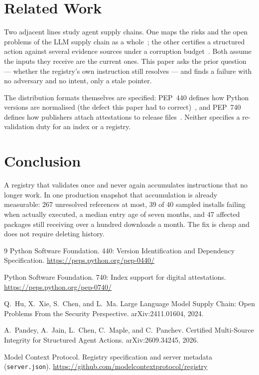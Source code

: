 \documentclass[acmsmall,screen,review,anonymous]{acmart}
\begin{document}
\section{Related Work}
Two adjacent lines study agent supply chains. One maps the risks and the open problems of the
LLM supply chain as a whole~\cite{llmsupplychain}; the other certifies a structured action
against several evidence sources under a corruption budget~\cite{multisource}. Both assume
the inputs they receive are the current ones. This paper asks the prior question --- whether
the registry's own instruction still resolves --- and finds a failure with no adversary and
no intent, only a stale pointer.

The distribution formats themselves are specified: PEP~440 defines how Python versions are
normalised (the defect this paper had to correct)~\cite{pep440}, and PEP~740 defines how
publishers attach attestations to release files~\cite{pep740}. Neither specifies a
re-validation duty for an index or a registry.

\section{Conclusion}
A registry that validates once and never again accumulates instructions that no longer
work. In one production snapshot that accumulation is already measurable: 267 unresolved
references at most, 39 of 40 sampled installs failing when actually executed, a median
entry age of seven months, and 47 affected packages still receiving over a hundred
downloads a month. The fix is cheap and does not require deleting history.


{\footnotesize
\begin{thebibliography}{9}
 Python Software Foundation.
 440: Version Identification and Dependency Specification.
\newblock \url{https://peps.python.org/pep-0440/}

 Python Software Foundation.
 740: Index support for digital attestations.
\newblock \url{https://peps.python.org/pep-0740/}

 Q.~Hu, X.~Xie, S.~Chen, and L.~Ma.
\newblock Large Language Model Supply Chain: Open Problems From the Security Perspective.
\newblock arXiv:2411.01604, 2024.

 A.~Pandey, A.~Jain, L.~Chen, C.~Maple, and C.~Panchev.
\newblock Certified Multi-Source Integrity for Structured Agent Actions.
\newblock arXiv:2609.34245, 2026.

 Model Context Protocol.
\newblock Registry specification and server metadata (\texttt{server.json}).
\newblock \url{https://github.com/modelcontextprotocol/registry}
\end{thebibliography}
}
\end{document}
